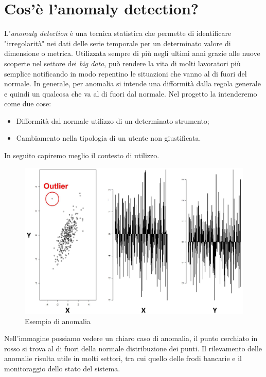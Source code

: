 \section{Cos'è l'anomaly detection?}
L'\emph{anomaly detection} è una tecnica statistica che permette di identificare "irregolarità" nei dati delle serie temporale per un determinato valore di dimensione o metrica. 
Utilizzata sempre di più negli ultimi anni grazie alle nuove scoperte nel settore dei \emph{big data}, può rendere la vita di molti lavoratori più semplice notificando in modo repentino le situazioni che vanno al di fuori del normale.
In generale, per anomalia si intende una difformità dalla regola generale e quindi un qualcosa che va al di fuori dal normale. Nel progetto la intenderemo come due cose:
\begin{itemize}
	\item Difformità dal normale utilizzo di un determinato strumento;
	\item Cambiamento nella tipologia di un utente non giustificata.
\end{itemize}
In seguito capiremo meglio il contesto di utilizzo.
\newpage
\begin{figure}[h!]
	\centering
	\includegraphics[scale=0.1]{figures/anomaly_detection_example}
	\caption[Esempio di anomalia.]{Esempio di anomalia \cite{anomalydetection}
		\label{fig:anomalia}}
\end{figure}	

Nell'immagine possiamo vedere un chiaro caso di anomalia, il punto cerchiato in rosso si trova al di fuori della normale distribuzione dei punti.
Il rilevamento delle anomalie risulta utile in molti settori, tra cui quello delle frodi bancarie e il monitoraggio dello stato del sistema. 
